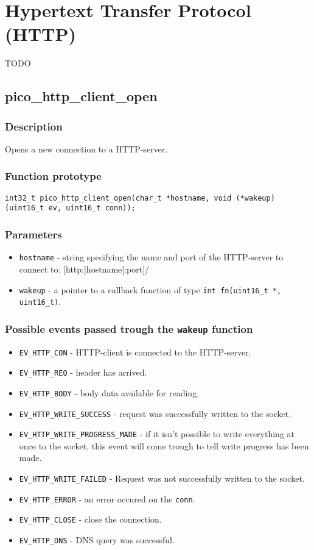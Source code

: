 \section{Hypertext Transfer Protocol (HTTP)}
TODO

\subsection{pico\_http\_client\_open}

\subsubsection*{Description}
Opens a new connection to a HTTP-server.

\subsubsection*{Function prototype}
\texttt{int32\_t pico\_http\_client\_open(char\_t *hostname, void (*wakeup)(uint16\_t ev, uint16\_t conn));}

\subsubsection*{Parameters}
\begin{itemize}[noitemsep]
\item \texttt{hostname} - string specifying the name and port of the HTTP-server to connect to. [http:]hostname[:port]/
\item \texttt{wakeup} - a pointer to a callback function of type \texttt{int fn(uint16\_t *, uint16\_t)}.
\end{itemize}

\subsubsection*{Possible events passed trough the \texttt{wakeup} function}
\begin{itemize}[noitemsep]
\item \texttt{EV\_HTTP\_CON} - HTTP-client is connected to the HTTP-server.
\item \texttt{EV\_HTTP\_REQ} - header has arrived.
\item \texttt{EV\_HTTP\_BODY} - body data available for reading.
\item \texttt{EV\_HTTP\_WRITE\_SUCCESS} - request was successfully written to the socket.
\item \texttt{EV\_HTTP\_WRITE\_PROGRESS\_MADE} - if it isn't possible to write everything at once to the socket, this event will come trough to tell write progress has been made.
\item \texttt{EV\_HTTP\_WRITE\_FAILED} - Request was not successfully written to the socket.
\item \texttt{EV\_HTTP\_ERROR} - an error occured on the \texttt{conn}.
\item \texttt{EV\_HTTP\_CLOSE} - close the connection.
\item \texttt{EV\_HTTP\_DNS} - DNS query was successful.
\end{itemize}
